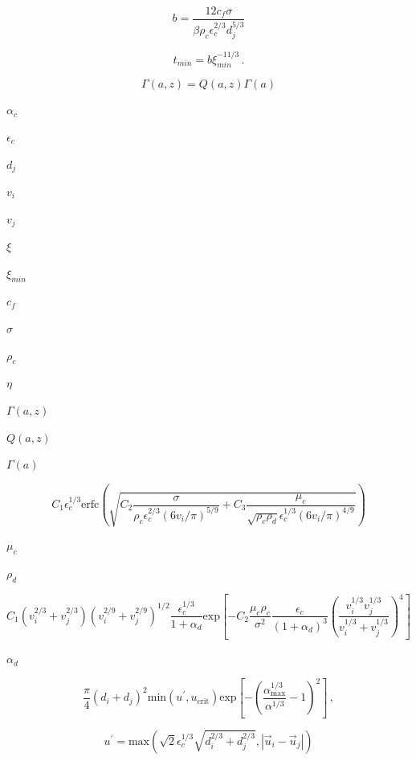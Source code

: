 \documentclass{article}
\begin{document}
\[
    b = \frac{12c_f\sigma}{\beta\rho_c\epsilon_c^{2/3}d_j^{5/3}}
\]
\pagebreak

\[
    t_{min} = b \xi_{min}^{-11/3}\,.
\]
\pagebreak

\[
    \Gamma(a,z) = Q(a,z) \Gamma(a)
\]
\pagebreak

$        \alpha_c    $
\pagebreak

$        \epsilon_c  $
\pagebreak

$        d_j         $
\pagebreak

$        v_i         $
\pagebreak

$        v_j         $
\pagebreak

$        \xi         $
\pagebreak

$        \xi_{min}   $
\pagebreak

$        c_f         $
\pagebreak

$        \sigma      $
\pagebreak

$        \rho_c      $
\pagebreak

$        \eta        $
\pagebreak

$        \Gamma(a,z) $
\pagebreak

$        Q(a,z)      $
\pagebreak

$        \Gamma(a)   $
\pagebreak

\[
    C_1 \epsilon_c^{1/3}
    \mathrm{erfc}
    \left(
        \sqrt
        {
            C_2 \frac{\sigma}{\rho_c \epsilon_c^{2/3} (6v_i/\pi)^{5/9}}
          + C_3 \frac{\mu_c}{\sqrt{\rho_c \rho_d}
            \epsilon_c^{1/3} (6v_i/\pi)^{4/9}}
        }
    \right)
\]
\pagebreak

$        \mu_c       $
\pagebreak

$        \rho_d      $
\pagebreak

\[
    C_1 (v_i^{2/3} + v_j^{2/3}) (v_i^{2/9} + v_j^{2/9})^{1/2}
    \frac{\epsilon_c^{1/3}}{1 + \alpha_d}
    \textrm{exp}
    \left[
      - C_2 \frac{\mu_c \rho_c}{\sigma^2}
        \frac{\epsilon_c}{(1 + \alpha_d)^{3}}
        \left(
            \frac{v_i^{1/3} v_j^{1/3}}{v_i^{1/3} + v_j^{1/3}}
        \right)^{4}
    \right]
\]
\pagebreak

$        \alpha_d    $
\pagebreak

\[
    \frac{\pi}{4} (d_i + d_j)^2 \mathrm{min}(u^{\prime}, u_{\mathrm{crit}})
    \mathrm{exp}
    \left[
      - \left(\frac{\alpha_{\mathrm{max}}^{1/3}}{\alpha^{1/3}} - 1\right)^2
    \right]\,,
\]
\pagebreak

\[
    u^{\prime}
  =
    \mathrm{max}
    \left(
        \sqrt{2} \epsilon_c^{1/3} \sqrt{d_i^{2/3} + d_j^{2/3}},
        |\vec{u}_i - \vec{u}_j|
    \right)
\]
\pagebreak
\end{document}
